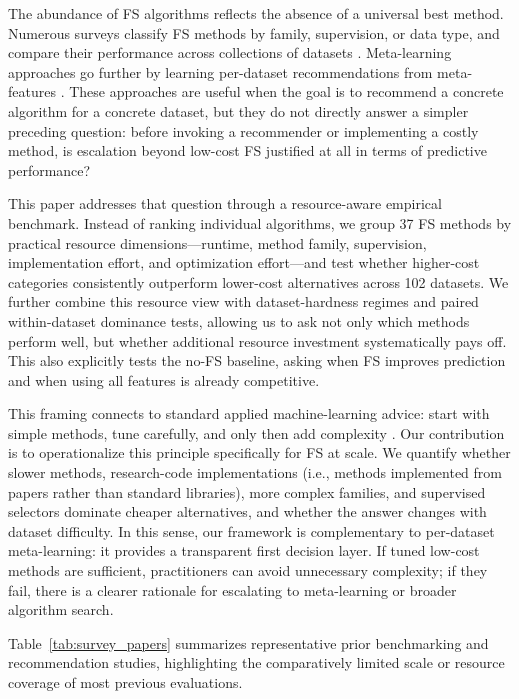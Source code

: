\documentclass[preprint,12pt,authoryear]{elsarticle}
\begin{document}
The abundance of FS algorithms reflects the absence of a universal best method. Numerous surveys classify FS methods by family, supervision, or data type, and compare their performance across collections of datasets \citep{weston2000feature,chandrashekar2014survey,bolon2014review,li2017feature,bommert2020benchmark,bommert2022benchmark,jiao2023survey}. Meta-learning approaches go further by learning per-dataset recommendations from meta-features \citep{filchenkov2015datasets,PARMEZAN20171}. These approaches are useful when the goal is to recommend a concrete algorithm for a concrete dataset, but they do not directly answer a simpler preceding question: before invoking a recommender or implementing a costly method, is escalation beyond low-cost FS justified at all in terms of predictive performance?

This paper addresses that question through a resource-aware empirical benchmark. Instead of ranking individual algorithms, we group 37 FS methods by practical resource dimensions---runtime, method family, supervision, implementation effort, and optimization effort---and test whether higher-cost categories consistently outperform lower-cost alternatives across 102 datasets. We further combine this resource view with dataset-hardness regimes and paired within-dataset dominance tests, allowing us to ask not only which methods perform well, but whether additional resource investment systematically pays off. This also explicitly tests the no-FS baseline, asking when FS improves prediction and when using all features is already competitive.

This framing connects to standard applied machine-learning advice: start with simple methods, tune carefully, and only then add complexity \citep{kuhn2013applied,kuhn2019feature,geron2019hands,domingos2012few}. Our contribution is to operationalize this principle specifically for FS at scale. We quantify whether slower methods, research-code implementations (i.e., methods implemented from papers rather than standard libraries), more complex families, and supervised selectors dominate cheaper alternatives, and whether the answer changes with dataset difficulty. In this sense, our framework is complementary to per-dataset meta-learning: it provides a transparent first decision layer. If tuned low-cost methods are sufficient, practitioners can avoid unnecessary complexity; if they fail, there is a clearer rationale for escalating to meta-learning or broader algorithm search.

Table~\ref{tab:survey_papers} summarizes representative prior benchmarking and recommendation studies, highlighting the comparatively limited scale or resource coverage of most previous evaluations.
\end{document}
